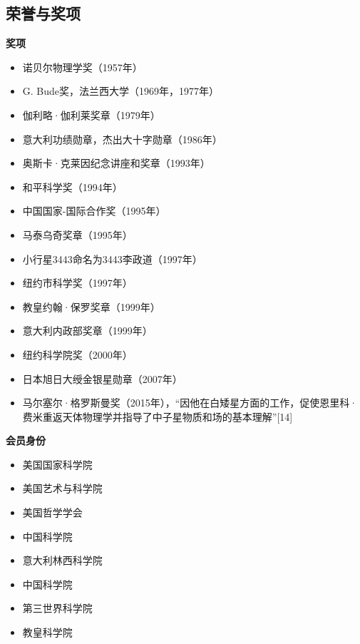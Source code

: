 \subsection{荣誉与奖项}
\textbf{奖项}  
\begin{itemize}
\item 诺贝尔物理学奖（1957年）  
\item G. Bude奖，法兰西大学（1969年，1977年）  
\item 伽利略·伽利莱奖章（1979年）  
\item 意大利功绩勋章，杰出大十字勋章（1986年）  
\item 奥斯卡·克莱因纪念讲座和奖章（1993年）  
\item 和平科学奖（1994年）  
\item 中国国家-国际合作奖（1995年）  
\item 马泰乌奇奖章（1995年）  
\item 小行星3443命名为3443李政道（1997年）  
\item 纽约市科学奖（1997年）  
\item 教皇约翰·保罗奖章（1999年）  
\item 意大利内政部奖章（1999年）  
\item 纽约科学院奖（2000年）  
\item 日本旭日大绶金银星勋章（2007年）  
\item 马尔塞尔·格罗斯曼奖（2015年），“因他在白矮星方面的工作，促使恩里科·费米重返天体物理学并指导了中子星物质和场的基本理解”[14]
\end{itemize}
\textbf{会员身份}  
\begin{itemize}
\item 美国国家科学院  
\item 美国艺术与科学院  
\item 美国哲学学会  
\item 中国科学院  
\item 意大利林西科学院  
\item 中国科学院  
\item 第三世界科学院  
\item 教皇科学院
\end{itemize}
